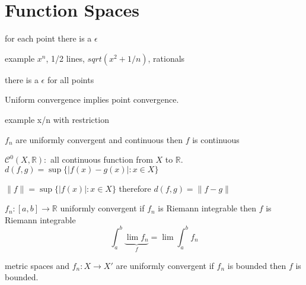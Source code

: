 \chapter{Function Spaces}
\begin{definition}
    for each point there is a \(\epsilon\)
\end{definition}
example \(x^n\), 1/2 lines, \(sqrt(x^2 + 1/n)\), rationals
\begin{definition}
    there is a \(\epsilon\) for all points
\end{definition}
\begin{corollary}
    Uniform convergence implies point convergence.
\end{corollary}
example x/n with restriction
\begin{theorem}
    \(f_n\) are uniformly convergent and continuous then \(f\) is continuous
\end{theorem}

\begin{definition}
    \(\mathcal{C}^0(X,\mathbb{R}):\) all continuous function from \(X \) to \(\mathbb{R}\). \(d(f,g) = \sup{\{|f(x) - g(x)| : x \in X\}}\)
\end{definition}
\begin{definition}
    \(\|f\| = \sup\{|f(x)| : x \in X\}\) therefore \(d(f,g) = \|f - g\|\)
\end{definition}

\begin{theorem}
    \(f_n:[a,b] \to \mathbb{R}\) uniformly convergent if \(f_n\) is Riemann integrable then \(f\) is Riemann integrable
    \[\int_{a}^{b} \underbrace{\lim{f_n}}_{f} = \lim{\int_{a}^{b}{f_n}}\]
\end{theorem}
\begin{lemma}
    metric spaces and \(f_n: X \to X'\) are uniformly convergent if \(f_n\) is bounded then \(f\) is bounded.
\end{lemma}

